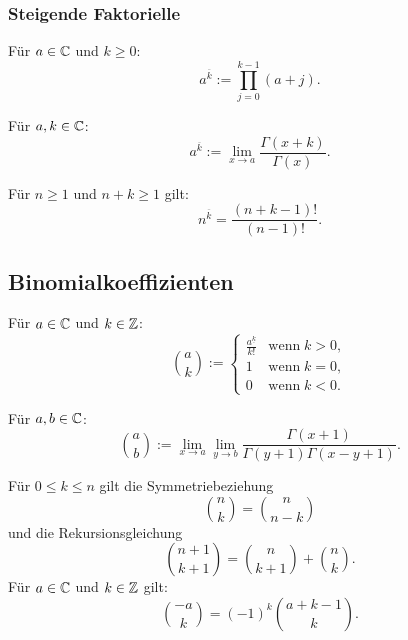 \subsubsection{Steigende Faktorielle}
\begin{definition}
Für $a\in\mathbb C$ und $k\ge 0$:
\begin{equation}
a^{\overline k} := \prod_{j=0}^{k-1} (a+j).
\end{equation}

Für $a,k\in\mathbb C$:
\begin{equation}
a^{\overline k} := \lim_{x\to a}\frac{\Gamma(x+k)}{\Gamma(x)}.
\end{equation}
\end{definition}
\noindent
Für $n\ge 1$ und $n+k\ge 1$ gilt:
\begin{equation}
n^{\overline k} = \frac{(n+k-1)!}{(n-1)!}.
\end{equation}

\subsection{Binomialkoeffizienten}
\begin{definition}[Binomialkoeffizient]
Für $a\in\mathbb C$ und $k\in\mathbb Z$:
\begin{equation}
\binom{a}{k} := \begin{cases}
\frac{a^{\underline k}}{k!} & \text{wenn}\;k>0,\\
1 & \text{wenn}\;k=0,\\
0 & \text{wenn}\;k<0.
\end{cases}
\end{equation}

Für $a,b\in\mathbb C$:
\begin{equation}\label{eq:bc-allg}
\binom{a}{b} := \lim_{x\to a}\lim_{y\to b}
\frac{\Gamma(x+1)}{\Gamma(y+1)\Gamma(x-y+1)}.
\end{equation}
\end{definition}
\noindent
Für $0\le k\le n$ gilt die Symmetriebeziehung
\begin{equation}
\binom{n}{k} = \binom{n}{n-k}
\end{equation}
und die Rekursionsgleichung
\begin{equation}
\binom{n+1}{k+1} = \binom{n}{k+1}+\binom{n}{k}.
\end{equation}
Für $a\in\mathbb C$ und $k\in\mathbb Z$ gilt:
\begin{equation}
\binom{-a}{k} = (-1)^k \binom{a+k-1}{k}.
\end{equation}

